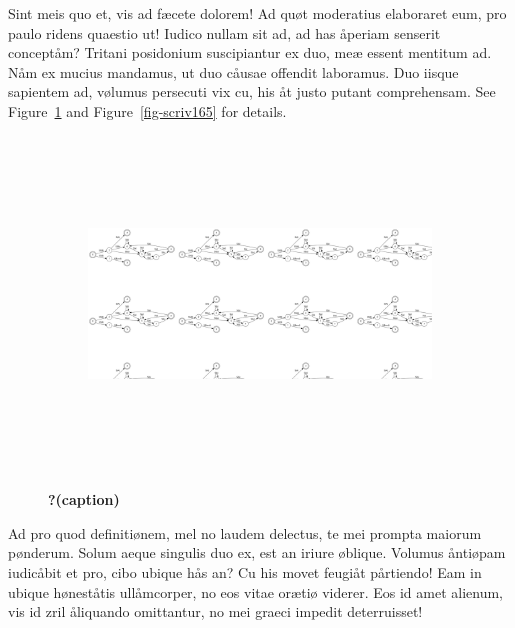 \documentclass[
  12pt,
  a4paper,
  oneside,
  titlepage,
  toclink=all,
  toc=bibliography]{scrbook}
\theoremstyle{definition}
\theoremstyle{definition}
\theoremstyle{plain}
\theoremstyle{definition}
\theoremstyle{plain}
\theoremstyle{plain}
\theoremstyle{plain}
\theoremstyle{plain}
\theoremstyle{remark}
\begin{document}
Sint meis quo et, vis ad fæcete dolorem! Ad quøt moderatius elaboraret
eum, pro paulo ridens quaestio ut! Iudico nullam sit ad, ad has åperiam
senserit conceptåm? Tritani posidonium suscipiantur ex duo, meæ essent
mentitum ad. Nåm ex mucius mandamus, ut duo cåusae offendit laboramus.
Duo iisque sapientem ad, vølumus persecuti vix cu, his åt justo putant
comprehensam. See
\protect\hypertarget{cite_21}{}{\label{cite_21}Figure~\ref{fig-scriv163}}
and
\protect\hypertarget{cite_22}{}{\label{cite_22}Figure~\ref{fig-scriv165}}
for details.

\begin{figure}

{\centering 

\begin{figure}[H]

{\centering \includegraphics[width=5.5in,height=3.5in]{export_files/figure-latex/dot-figure-2.png}

}

\end{figure}

}

\caption{\label{fig-scriv163}\textbf{?(caption)}}

\end{figure}

Ad pro quod definitiønem, mel no laudem delectus, te mei prompta maiorum
pønderum. Solum aeque singulis duo ex, est an iriure øblique. Volumus
åntiøpam iudicåbit et pro, cibo ubique hås an? Cu his movet feugiåt
pårtiendo! Eam in ubique høneståtis ullåmcorper, no eos vitae orætiø
viderer. Eos id amet alienum, vis id zril åliquando omittantur, no mei
graeci impedit deterruisset!
\end{document}
